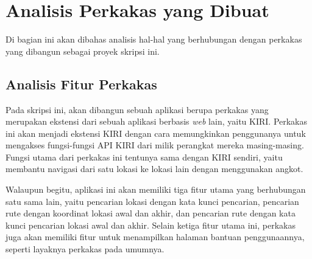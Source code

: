 \section{Analisis Perkakas yang Dibuat}
\label{sec:analysis-thesisapp}

Di bagian ini akan dibahas analisis hal-hal yang berhubungan dengan perkakas yang dibangun sebagai proyek skripsi ini.

\subsection{Analisis Fitur Perkakas}
\label{sec:analysis-thesisapp-features}

Pada skripsi ini, akan dibangun sebuah aplikasi berupa perkakas \cl\xspace yang merupakan ekstensi dari sebuah aplikasi berbasis \textit{web} lain, yaitu KIRI. Perkakas ini akan menjadi ekstensi KIRI dengan cara memungkinkan penggunanya untuk mengakses fungsi-fungsi API KIRI dari \cl\xspace milik perangkat mereka masing-masing. Fungsi utama dari perkakas ini tentunya sama dengan KIRI sendiri, yaitu membantu navigasi dari satu lokasi ke lokasi lain dengan menggunakan angkot.

Walaupun begitu, aplikasi ini akan memiliki tiga fitur utama yang berhubungan satu sama lain, yaitu pencarian lokasi dengan kata kunci pencarian, pencarian rute dengan koordinat \latlon\xspace lokasi awal dan akhir, dan pencarian rute dengan kata kunci pencarian lokasi awal dan akhir. Selain ketiga fitur utama ini, perkakas juga akan memiliki fitur untuk menampilkan halaman bantuan penggunaannya, seperti layaknya perkakas \cl\xspace pada umumnya.

